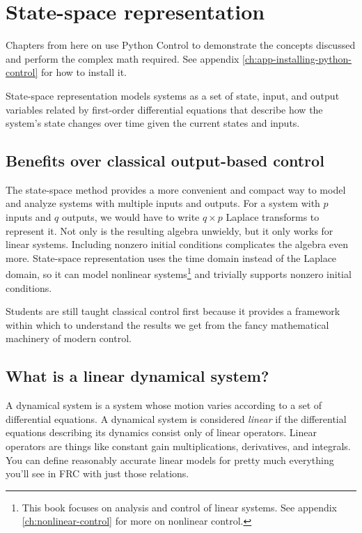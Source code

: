 
\chapter{State-space representation}

\begin{remark}
  Chapters from here on use Python Control to demonstrate the concepts discussed
  and perform the complex math required. See appendix
  \ref{ch:app-installing-python-control} for how to install it.
\end{remark}

State-space representation models \glspl{system} as a set of \gls{state}, input,
and output variables related by first-order differential equations that describe
how the system's state changes over time given the current \glspl{state} and
inputs.

\section{Benefits over classical output-based control}

The state-space method provides a more convenient and compact way to model and
analyze \glspl{system} with multiple inputs and outputs. For a system with $p$
inputs and $q$ outputs, we would have to write $q \times p$ Laplace transforms
to represent it. Not only is the resulting algebra unwieldy, but it only works
for linear systems. Including nonzero initial conditions complicates the algebra
even more. State-space representation uses the time domain instead of the
Laplace domain, so it can model nonlinear systems\footnote{This book focuses on
analysis and control of linear systems. See appendix \ref{ch:nonlinear-control}
for more on nonlinear control.} and trivially supports nonzero initial
conditions.

Students are still taught classical control first because it provides a
framework within which to understand the results we get from the fancy
mathematical machinery of modern control.

\section{What is a linear dynamical system?}

A dynamical system is a system whose motion varies according to a set of
differential equations. A dynamical system is considered \textit{linear} if the
differential equations describing its dynamics consist only of linear operators.
Linear operators are things like constant gain multiplications, derivatives, and
integrals. You can define reasonably accurate linear models for pretty much
everything you'll see in FRC with just those relations.

